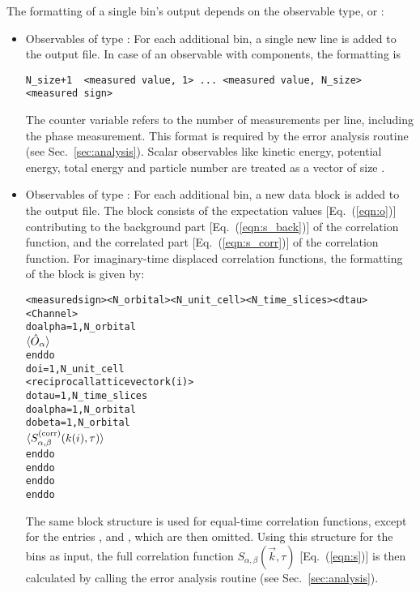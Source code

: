 The formatting of a single bin's output depends on the observable type,  or :
\begin{itemize}
\item Observables of type :
For each additional bin, a single new line is added to the output file.
In case of an observable with  components, the formatting is 
{\small
\begin{verbatim}
N_size+1  <measured value, 1> ... <measured value, N_size>  <measured sign>
\end{verbatim}
}
The counter variable  refers to the number of measurements per line, including the phase measurement. 
This format is required by the error analysis routine (see Sec.~\ref{sec:analysis}). 
Scalar observables like kinetic energy, potential energy, total energy and particle number are treated as a vector 
of size .

\item Observables of type :
For each additional bin, a new data block is added to the output file. 
The block consists of the expectation values [Eq.~(\ref{eqn:o})] contributing to the background part [Eq.~(\ref{eqn:s_back})] of the correlation function,
and the correlated part [Eq.~(\ref{eqn:s_corr})] of the correlation function.
For imaginary-time displaced correlation functions, the formatting of the block is given by:
{\small
\begin{alltt}
<measured sign> <N_orbital> <N_unit_cell> <N_time_slices> <dtau> <Channel>
do alpha = 1, N_orbital
   \(\langle\hat{O}\sb{\alpha}\rangle \)
enddo
do i = 1, N_unit_cell
   <reciprocal lattice vector k(i)>
   do tau = 1, N_time_slices
      do alpha = 1, N_orbital
         do beta = 1, N_orbital
            \(\langle{S}\sb{\alpha,\beta}\sp{(\mathrm{corr})}(k(i),\tau)\rangle\)
         enddo
      enddo
   enddo
enddo
\end{alltt}
}
The same block structure is used for equal-time correlation functions, except for the entries  ,  and , which are then omitted.
Using this structure for the bins as input, the full correlation function $S_{\alpha,\beta}(\vec{k},\tau)$ [Eq.~(\ref{eqn:s})] is then calculated by calling the error analysis routine (see Sec.~\ref{sec:analysis}).
\end{itemize}


%

